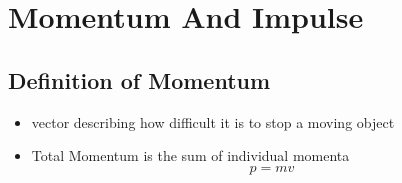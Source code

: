 \documentclass[../Notes.tex]{subfiles}
\begin{document}
    \section{Momentum And Impulse}
    
    \subsection{Definition of Momentum}
    \begin{itemize}
        \item vector describing how difficult it is to stop a moving object
        \item Total Momentum is the sum of individual momenta
        \begin{equation*}
            p = mv
        \end{equation*}
    \end{itemize}
\end{document}
